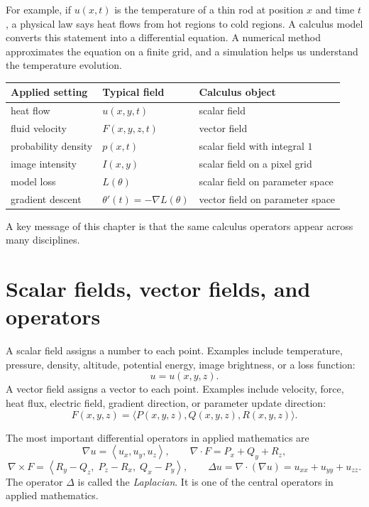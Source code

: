 \documentclass[11pt]{article}
\newcommand{\grad}{\nabla}
\newcommand{\Div}{\nabla\!\cdot}
\newcommand{\Curl}{\nabla\!\times}
\newcommand{\Lap}{\Delta}
\begin{document}
For example, if $u(x,t)$ is the temperature of a thin rod at position $x$ and time $t$, a physical law says heat flows from hot regions to cold regions. A calculus model converts this statement into a differential equation. A numerical method approximates the equation on a finite grid, and a simulation helps us understand the temperature evolution.

\begin{center}
\begin{tabular}{@{}lll@{}}
\toprule
Applied setting & Typical field & Calculus object \\
\midrule
heat flow & $u(x,y,t)$ & scalar field \\
fluid velocity & $F(x,y,z,t)$ & vector field \\
probability density & $p(x,t)$ & scalar field with integral $1$ \\
image intensity & $I(x,y)$ & scalar field on a pixel grid \\
model loss & $L(\theta)$ & scalar field on parameter space \\
gradient descent & $\theta'(t)=-\grad L(\theta)$ & vector field on parameter space \\
\bottomrule
\end{tabular}
\end{center}

A key message of this chapter is that the same calculus operators appear across many disciplines.

\section{Scalar fields, vector fields, and operators}

A scalar field assigns a number to each point. Examples include temperature, pressure, density, altitude, potential energy, image brightness, or a loss function:
\[
u=u(x,y,z).
\]
A vector field assigns a vector to each point. Examples include velocity, force, heat flux, electric field, gradient direction, or parameter update direction:
\[
F(x,y,z)=\langle P(x,y,z),Q(x,y,z),R(x,y,z)\rangle.
\]

The most important differential operators in applied mathematics are
\[
\grad u=\left\langle u_x,u_y,u_z\right\rangle,
\qquad
\Div F=P_x+Q_y+R_z,
\]
\[
\Curl F=\left\langle R_y-Q_z,\; P_z-R_x,\; Q_x-P_y\right\rangle,
\qquad
\Lap u=\Div(\grad u)=u_{xx}+u_{yy}+u_{zz}.
\]
The operator $\Lap$ is called the \emph{Laplacian}. It is one of the central operators in applied mathematics.
\end{document}
